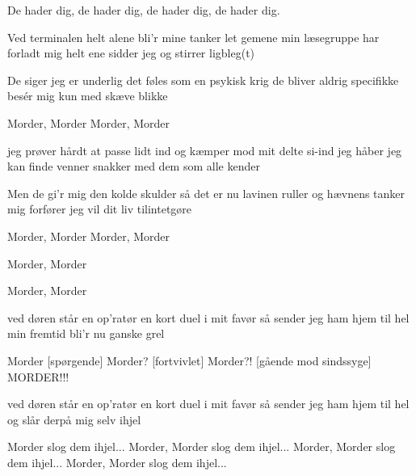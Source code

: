 \documentclass[a4paper,11pt]{article}
\begin{document}
\begin{song}

 De hader dig, de hader dig, de hader dig, de hader dig.


 Ved terminalen helt alene
bli'r mine tanker let gemene
min læsegruppe har forladt mig
helt ene sidder jeg og stirrer ligbleg(t)

 De siger jeg er underlig
det føles som en psykisk krig
de bliver aldrig specifikke
besér mig kun med skæve blikke


 Morder, Morder
Morder, Morder

 jeg prøver hårdt at passe lidt ind
og kæmper mod mit delte si-ind
jeg håber jeg kan finde venner
snakker med dem som alle kender

 Men de gi'r mig den kolde skulder
så det er nu lavinen ruller
og hævnens tanker mig forfører
jeg vil dit liv tilintetgøre


 Morder, Morder
Morder, Morder


 Morder, Morder


 Morder, Morder

 ved døren står en op'ratør
en kort duel i mit favør
så sender jeg ham hjem til hel
min fremtid bli'r nu ganske grel

 Morder
[spørgende] Morder?
[fortvivlet] Morder?!
[gående mod sindssyge]  MORDER!!!

 ved døren står en op'ratør
en kort duel i mit favør
så sender jeg ham hjem til hel
og slår derpå mig selv ihjel

 Morder
 slog dem ihjel...
 Morder, Morder
 slog dem ihjel...
 Morder, Morder
 slog dem ihjel...
 Morder, Morder
 slog dem ihjel...


\end{song}
\end{document}
